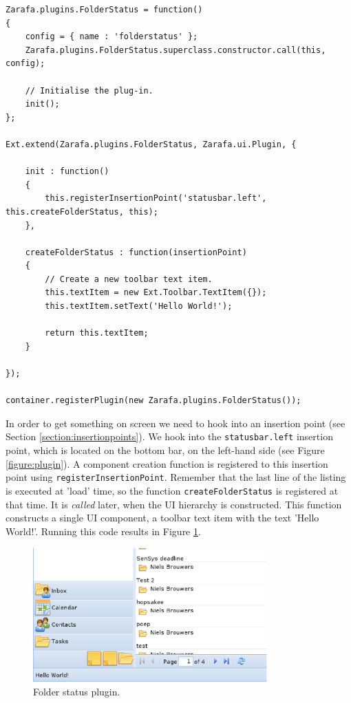 \begin{lstlisting}[caption={Plugin boilerplate}, label=listing:plugin1]
Zarafa.plugins.FolderStatus = function()
{
	config = { name : 'folderstatus' };
	Zarafa.plugins.FolderStatus.superclass.constructor.call(this, config);
	
	// Initialise the plug-in.
	init();
};

Ext.extend(Zarafa.plugins.FolderStatus, Zarafa.ui.Plugin, {

	init : function()
	{
		this.registerInsertionPoint('statusbar.left', this.createFolderStatus, this);
	},
	
	createFolderStatus : function(insertionPoint)
	{
		// Create a new toolbar text item.
		this.textItem = new Ext.Toolbar.TextItem({});
		this.textItem.setText('Hello World!');

		return this.textItem;
	}

});

container.registerPlugin(new Zarafa.plugins.FolderStatus());
\end{lstlisting}

In order to get something on screen we need to hook into an insertion point 
(see Section \ref{section:insertionpoints}). We hook into the {\tt statusbar.left} insertion
point, which is located on the bottom bar, on the left-hand side (see Figure \ref{figure:plugin}).
A component creation function is registered to this insertion point using {\tt registerInsertionPoint}.
Remember that the last line of the listing is executed at 'load' time, so the function 
{\tt createFolderStatus} is registered at that time. It is \emph{called} later, when the UI hierarchy 
is constructed. This function constructs a single UI component, a toolbar text item with the text 
'Hello World!'. 
Running this code results in Figure \ref{figure:plugin2}.

\begin{figure}[h!]
\centering
\includegraphics[width=9cm]{figures/plugin2.eps}
\caption{Folder status plugin.}
\label{figure:plugin2}
\end{figure}


